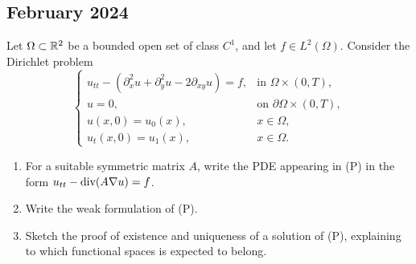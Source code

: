 \newpage
\subsection{February 2024}
\begin{exercise}
    Let \(\Omega \subset \mathbb{R}^2\) be a bounded open set of class \(C^1\), and let \(f \in L^2(\Omega)\). Consider the Dirichlet problem
    \begin{equation*}
        \begin{cases}
            u_{tt} - \left(\partial_x^2 u +  \partial_y^2 u - 2 \partial_{xy} u\right) = f, & \text{in } \Omega \times (0, T), \\
            u = 0, & \text{on } \partial \Omega \times (0, T), \\
            u(x,0) = u_0(x), & x \in \Omega, \\
            u_t(x,0) = u_1(x), & x \in \Omega.
        \end{cases}
        \tag{(P)}
    \end{equation*}
    \begin{enumerate}
        \item For a suitable symmetric matrix \(A\), write the PDE appearing in (P) in the form \(u_{tt} - \text{div}(A \nabla u) = f\).
        \item Write the weak formulation of (P).
        \item Sketch the proof of existence and uniqueness of a solution of (P), explaining to which functional spaces is expected to belong.
    \end{enumerate}
\end{exercise}
